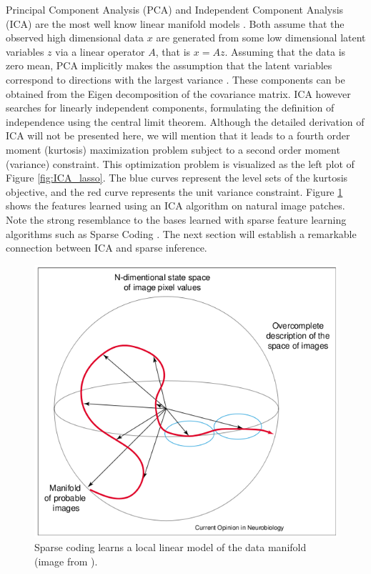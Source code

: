 Principal Component Analysis (PCA) and Independent Component Analysis (ICA) are
the most well know linear manifold models \cite{ICA}. Both assume that the
observed high dimensional data $x$ are generated from some low dimensional
latent variables $z$ via a linear operator $A$, that is $x=Az$. Assuming that
the data is zero mean, PCA implicitly makes the assumption that the latent
variables correspond to directions with the largest variance \cite{PCA}.  These
components can be obtained from the Eigen decomposition of the covariance
matrix.  ICA however searches for linearly independent components, formulating
the definition of independence using the central limit theorem. Although the
detailed derivation of ICA will not be presented here, we will mention that it
leads to a fourth order moment (kurtosis) maximization problem subject to a
second order moment (variance) constraint. This optimization problem is
visualized as the left plot of Figure \ref{fig:ICA_lasso}. The blue curves
represent the level sets of the kurtosis objective, and the red curve
represents the unit variance constraint. Figure \ref{fig:ICA_features}  shows
the features learned using an ICA algorithm on natural image patches.  Note the
strong resemblance to the bases learned with sparse feature learning algorithms
such as Sparse Coding \cite{SC}. The next section will establish a remarkable
connection between ICA and sparse inference.  

\begin{figure} 
\centering
\includegraphics[scale=0.4]{./figures/related_work/imageManifold.png} 
\caption{Sparse coding learns a local linear model of the data manifold (image from \cite{SC2}).}
\label{fig:ICA_features} 
\end{figure} 

